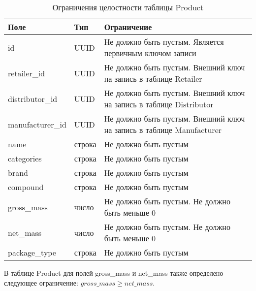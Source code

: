 \begin{table}[!h]
	\begin{center}
		\begin{threeparttable}
			\caption{Ограничения целостности таблицы Product}
			\label{tbl:entity_product}
			\begin{tabular}{|p{4.5cm}|p{2.5cm}|p{8.5cm}|}
				\hline 
				\textbf{Поле} & \textbf{Тип} & \textbf{Ограничение}  \\
				\hline
				id & UUID & Не должно быть пустым. Является первичным ключом записи  \\
				\hline
				retailer\_id & UUID & Не должно быть пустым. Внешний ключ на запись в таблице Retailer  \\
				\hline
				distributor\_id & UUID & Не должно быть пустым. Внешний ключ на запись в таблице Distributor \\
				\hline
				manufacturer\_id & UUID & Не должно быть пустым. Внешний ключ на запись в таблице Manufacturer  \\
				\hline
				name & строка & Не должно быть пустым  \\
				\hline
				categories & строка & Не должно быть пустым  \\
				\hline
				brand & строка & Не должно быть пустым  \\
				\hline
				compound & строка & Не должно быть пустым  \\
				\hline
				gross\_mass & число & Не должно быть пустым. Не должно быть меньше 0  \\
				\hline
				net\_mass & число & Не должно быть пустым. Не должно быть меньше 0  \\
				\hline
				package\_type & строка & Не должно быть пустым  \\
				\hline
			\end{tabular}
		\end{threeparttable}			
	\end{center}
\end{table}

В таблице Product для полей gross\_mass и net\_mass также определено следующее ограничение: $ gross\_mass \geq net\_mass $.

